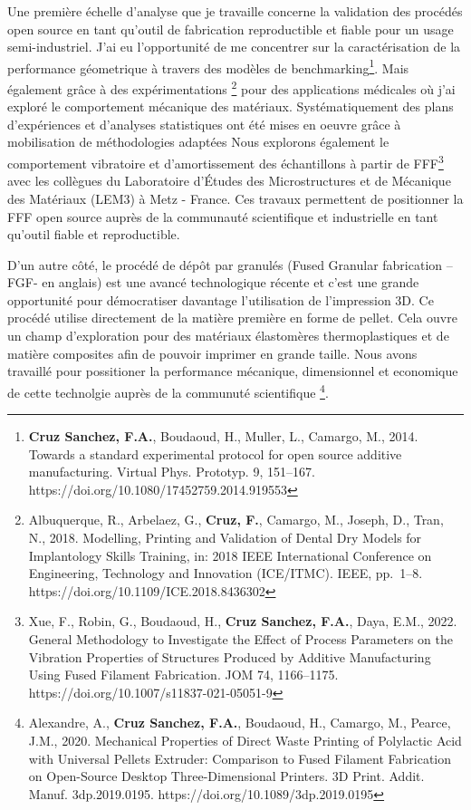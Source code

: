 \documentclass[
  11pt,
]{article}
\begin{document}
Une première échelle d'analyse que je travaille concerne la validation
des procédés open source en tant qu'outil de fabrication reproductible
et fiable pour un usage semi-industriel. J'ai eu l'opportunité de me
concentrer sur la caractérisation de la performance géometrique à
travers des modèles de benchmarking\footnote{\textbf{Cruz Sanchez,
  F.A.}, Boudaoud, H., Muller, L., Camargo, M., 2014. Towards a standard
  experimental protocol for open source additive manufacturing. Virtual
  Phys. Prototyp. 9, 151--167.
  https://doi.org/10.1080/17452759.2014.919553}. Mais également grâce à
des expérimentations \footnote{Albuquerque, R., Arbelaez, G.,
  \textbf{Cruz, F.}, Camargo, M., Joseph, D., Tran, N., 2018. Modelling,
  Printing and Validation of Dental Dry Models for Implantology Skills
  Training, in: 2018 IEEE International Conference on Engineering,
  Technology and Innovation (ICE/ITMC). IEEE, pp.~1--8.
  https://doi.org/10.1109/ICE.2018.8436302} pour des applications
médicales où j'ai exploré le comportement mécanique des matériaux.
Systématiquement des plans d'expériences et d'analyses statistiques ont
été mises en oeuvre grâce à mobilisation de méthodologies adaptées Nous
explorons également le comportement vibratoire et d'amortissement des
échantillons à partir de FFF\footnote{Xue, F., Robin, G., Boudaoud, H.,
  \textbf{Cruz Sanchez, F.A.}, Daya, E.M., 2022. General Methodology to
  Investigate the Effect of Process Parameters on the Vibration
  Properties of Structures Produced by Additive Manufacturing Using
  Fused Filament Fabrication. JOM 74, 1166--1175.
  https://doi.org/10.1007/s11837-021-05051-9} avec les collègues du
Laboratoire d'Études des Microstructures et de Mécanique des Matériaux
(LEM3) à Metz - France. Ces travaux permettent de positionner la FFF
open source auprès de la communauté scientifique et industrielle en tant
qu'outil fiable et reproductible.

D'un autre côté, le procédé de dépôt par granulés (Fused Granular
fabrication --FGF- en anglais) est une avancé technologique récente et
c'est une grande opportunité pour démocratiser davantage l'utilisation
de l'impression 3D. Ce procédé utilise directement de la matière
première en forme de pellet. Cela ouvre un champ d'exploration pour des
matériaux élastomères thermoplastiques et de matière composites afin de
pouvoir imprimer en grande taille. Nous avons travaillé pour possitioner
la performance mécanique, dimensionnel et economique de cette technolgie
auprès de la communuté scientifique \footnote{Alexandre, A.,
  \textbf{Cruz Sanchez, F.A.}, Boudaoud, H., Camargo, M., Pearce, J.M.,
  2020. Mechanical Properties of Direct Waste Printing of Polylactic
  Acid with Universal Pellets Extruder: Comparison to Fused Filament
  Fabrication on Open-Source Desktop Three-Dimensional Printers. 3D
  Print. Addit. Manuf. 3dp.2019.0195.
  https://doi.org/10.1089/3dp.2019.0195}.
\end{document}
